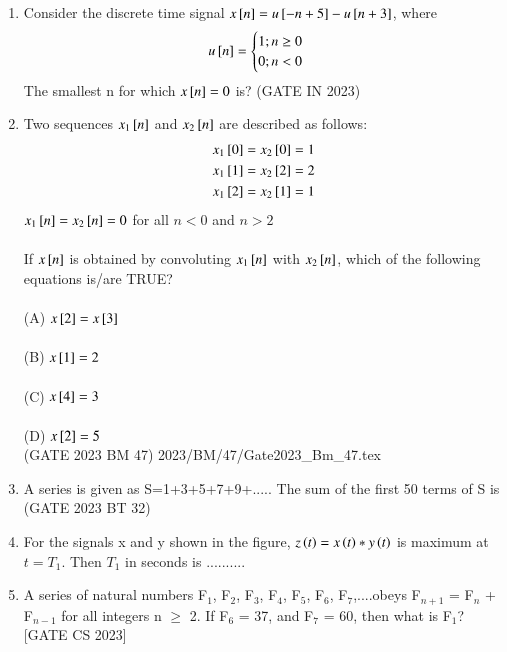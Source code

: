 \begin{enumerate}[label=\thechapter.\arabic*,ref=\thechapter.\theenumi]

\item Consider the discrete time signal $x{}\left[n\right] = u{}\left[-n+5\right] - u{}\left[n+3\right]$, where
\[u{}\left[n\right] = 
\begin{cases}
    1;n\geq0\\
    0;n<0
\end{cases}
\]
The smallest n for which $x{}\left[n\right] = 0$ is?
\hfill(GATE IN 2023)
\\ \solution

\newpage
\item Two sequences $x_1{}\left[n\right] $ and $ x_2 {}\left[n\right]$ are described as follows:
\begin{align}
x_1{}\left[0\right] = x_2{}\left[0\right] = 1\\
x_1{}\left[1\right] = x_2{}\left[2\right] = 2\\
x_1{}\left[2\right] = x_2{}\left[1\right] = 1
\end{align}
$x_1{}\left[n\right] = x_2{}\left[n\right] = 0$ for all $n<0$ and $n>2$\\
\\
If $x{}\left[n\right]$ is obtained by convoluting $x_1{}\left[n\right]$ with $x_2{}\left[n\right]$, which of the following equations is/are TRUE?\\
\\
(A) $x{}\left[2\right] = x{}\left[3\right]$\\
\\
(B) $x{}\left[1\right] = 2$\\
\\
(C) $x{}\left[4\right] = 3$\\
\\
(D) $x{}\left[2\right] = 5$\\
\hfill(GATE 2023 BM 47)
\solution
 {2023/BM/47/Gate2023_Bm_47.tex}
\pagebreak
\item A series  is given as S=1+3+5+7+9+..... The sum of the first 50 terms of S is \underline{\hspace{1in}}
\hfill(GATE 2023 BT 32)
\\ \solution

\pagebreak

\item For the signals x and y shown in the figure, $z\left(t\right)=x\left(t\right)*y\left(t\right)$ is maximum at $t=T_1$. Then $T_1$ in seconds is .......... 
\solution
\pagebreak

\item A series of natural numbers F$_1$, F$_2$, F$_3$, F$_4$, F$_5$, F$_6$, F$_7$,....obeys F$_{n+1}$ = F$_n$ + F$_{n-1}$ for all integers n $\geq$ 2. If F$_6$ = 37, and F$_7$ = 60, then what is F$_1$?\\  
 \hfill[GATE CS 2023] \\
 \solution 
 
 \pagebreak


\end{enumerate}
